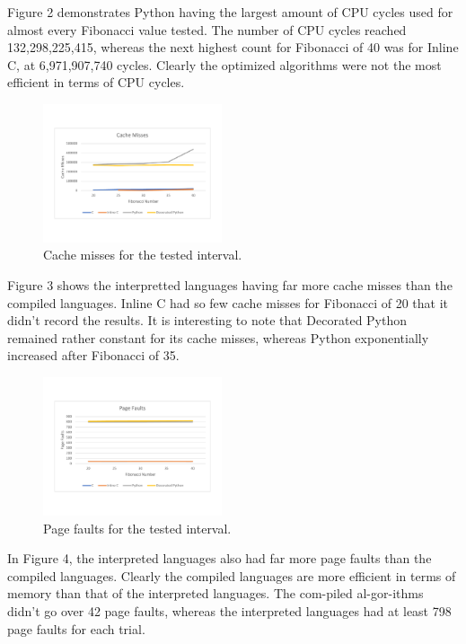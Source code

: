 \documentclass{sig-alternate}
\begin{document}
Figure 2 demonstrates Python having the largest 
amount of CPU cycles used for almost every Fibonacci value tested. The 
number of CPU cycles reached 132,298,225,415,
 whereas the next highest count for Fibonacci of 40 
was for Inline C, at 6,971,907,740 cycles. Clearly the optimized
 algorithms were not the most efficient in terms of CPU cycles.

\begin{figure}[ht]
	\centering
		\includegraphics[width=0.47\textwidth] {CacheMisses.pdf}
	\caption{Cache misses for the tested interval.}
	\label{Cache misses}
\end{figure}

Figure 3 shows the interpretted languages having far more cache misses than the compiled languages. Inline C had so few cache misses for Fibonacci of 20 that it didn't record the results. It is interesting to note that Decorated Python remained rather constant for its cache misses, whereas Python exponentially increased after Fibonacci of 35.

\begin{figure}[h]
	\centering
		\includegraphics[width=0.47\textwidth] {PageFaults.pdf}
	\caption{Page faults for the tested interval.}
	\label{Page Faults}
\end{figure}

In Figure 4, the interpreted languages also had far more page faults than the compiled languages. Clearly the 
compiled languages are more efficient in terms of memory than that of the interpreted languages. The com-piled al-gor-ithms didn't go over 42 page faults, whereas the interpreted languages had at least 798 page faults for each trial.
\end{document}
